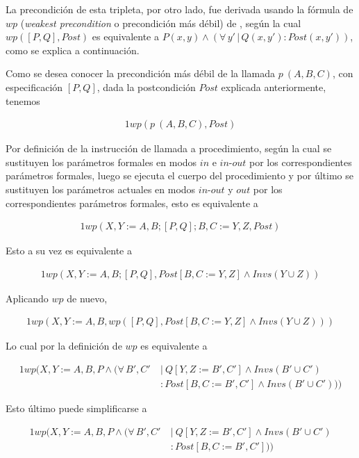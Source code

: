 La precondición de esta tripleta, por otro lado, fue derivada usando la fórmula de $wp$ (\textit{weakest precondition} o precondición más débil) de \cite{flaviani}, según la cual $wp([P, Q], Post)$ es equivalente a $P (x,y) \land (\forall\, y'\,|\,Q(x, y') : Post (x, y'))$, como se explica a continuación.

Como se desea conocer la precondición más débil de la llamada $p\  (A,B,C)$, con especificación $[P, Q]$, dada la postcondición $Post$ explicada anteriormente, tenemos

\begin{alignat}{1}%
wp(p\  (A,B,C), Post)
\end{alignat}

Por definición de la instrucción de llamada a procedimiento, según la cual se sustituyen los parámetros formales en modos $in$ e $in\textrm{-}out$ por los correspondientes parámetros formales, luego se ejecuta el
cuerpo del procedimiento y por último se sustituyen los parámetros
actuales en modos $in\textrm{-}out$ y $out$ por los correspondientes parámetros formales, esto es equivalente a

\begin{alignat}{1}%
wp(X,Y := A,B; [P,Q]; B,C := Y,Z, Post)
\end{alignat}

Esto a su vez es equivalente a

\begin{alignat}{1}%
wp(X,Y := A,B; [P,Q], Post[B,C := Y,Z] \land Invs(Y \cup Z))
\end{alignat}

Aplicando $wp$ de nuevo,

\begin{alignat}{1}%
wp(X,Y := A,B, wp([P,Q], Post[B,C := Y,Z] \land Invs(Y \cup Z)))
\end{alignat}

Lo cual por la definición de $wp$ es equivalente a

\begin{alignat}{1}%
wp(X,Y := A,B, P \land (\forall\, B',C'\ &|\ Q [Y,Z := B',C'] \land Invs (B' \cup C') \nonumber \\
                                       &: Post [B,C := B',C'] \land Invs (B' \cup C')))
\end{alignat}

Esto último puede simplificarse a

\begin{alignat}{1}%
wp(X,Y := A,B, P \land (\forall\, B',C'\ &|\ Q [Y,Z := B',C'] \land Invs (B' \cup C') \nonumber \\
                                       &: Post [B,C := B',C']))
\end{alignat}

